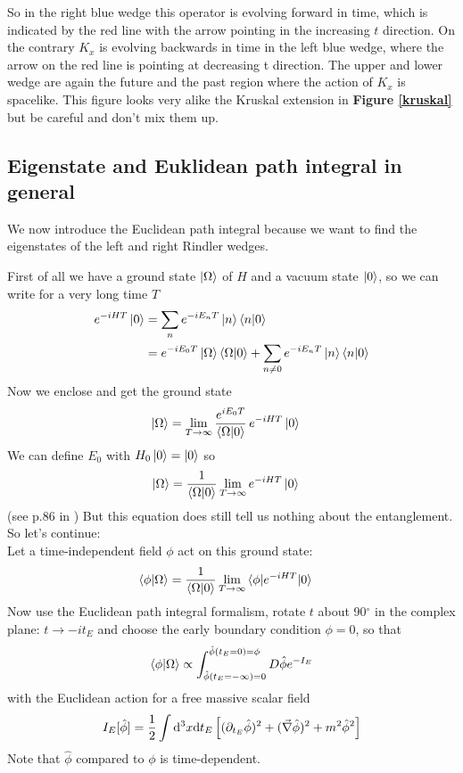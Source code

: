 	So in the right blue wedge this operator is evolving forward in time, which is indicated by the red line with the arrow pointing in the increasing $t$ direction. On the contrary $K_x$ is evolving backwards in time in the left blue wedge, where the arrow on the red line is pointing at decreasing t direction. The upper and lower wedge are again the future and the past region where the action of $K_x$ is spacelike. 
	This figure looks very alike the Kruskal extension in \textbf{Figure \ref{kruskal}} but be careful and don't mix them up.
	\FloatBarrier
	\subsection{Eigenstate and Euklidean path integral in general \checkmark}
	We now introduce the Euclidean path integral because we want to find the eigenstates of the left and right Rindler wedges. 
	
	First of all we have a ground state $\ket{\Omega}$ of $H$ and a vacuum state $\ket{0}$, so we can write for a very long time $T$
	\begin{align*}
		e^{-iHT}\ket{0} &= \sum_n e^{-iE_n T} \ket{n}\braket{n|0} \\
		&= e^{-iE_0 T} \ket{\Omega} \braket{\Omega|0} 
		+ \sum_{n\neq 0} e^{-iE_n T} \ket{n} \braket{n|0}
	\end{align*}
	Now we enclose and get the ground state
	\begin{align*}
		\ket{\Omega} &= \lim\limits_{T \rightarrow \infty} \frac{e^{iE_0 T}}{\braket{\Omega|0}} \,e^{-iHT} \ket{0}
	\end{align*}
	We can define $E_0$ with $H_0\ket{0}=\ket{0}$ so
	\begin{align*}
		\ket{\Omega} &=  \frac{1}{\braket{\Omega|0}} \lim\limits_{T \rightarrow \infty} e^{-iHT} \ket{0}
	\end{align*}
	(see p.86 in \cite{PaS}) But this equation does still tell us nothing about the entanglement. So let's continue: \\
	Let a time-independent field $\phi$%
	act on this ground state:
	\begin{align*} \label{groundstate_phi}
		\braket{\phi|\Omega} &= \frac{1}{\braket{\Omega|0}} \lim\limits_{T\rightarrow \infty} \braket{\phi|e^{-iHT}|0} 
	\end{align*}
	Now use the Euclidean path integral formalism, rotate $t$ about 90$^\circ$ in the complex plane: $t \rightarrow -i t_E$ and choose the early boundary condition $\phi=0$, so that
	\begin{align}
		\braket{\phi|\Omega} \propto \int_{\hat{\phi}(t_E = -\infty)= 0}^{\hat{\phi}(t_E = 0)=\phi} D\hat{\phi}e^{-I_E}
	\end{align}
	with the Euclidean action for a free massive scalar field
	\begin{align}
		I_E[\hat{\phi}] = \frac{1}{2} \int \mathrm{d}^3x \mathrm{d} t_E \left[
			(\partial_{t_E}\hat{\phi})^2 
			+ (\vec{\nabla}\hat{\phi})^2
			+ m^2\hat{\phi}^2
		\right]
	\end{align}
	Note that $\hat{\phi}$ compared to $\phi$ is time-dependent.
	

